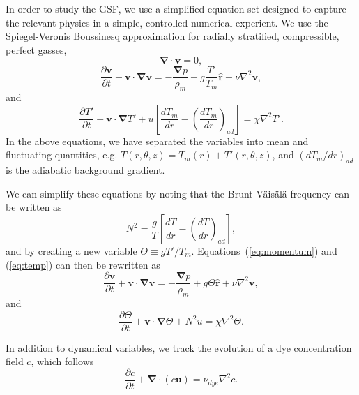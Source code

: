 \documentclass{jfm}
\begin{document}
In order to study the GSF, we use a simplified equation set designed
to capture the relevant physics in a simple, controlled numerical
experient. We use the Spiegel-Veronis Boussinesq approximation for
radially stratified, compressible, perfect gasses,
\begin{equation}
  \label{eq:continuity}
  \mathbf{\nabla \cdot v} = 0,
\end{equation}
\begin{equation}
  \label{eq:momentum}
  \frac{\partial \mathbf{v}}{\partial t} + \mathbf{v \cdot \nabla v} = -\frac{\mathbf{\nabla} p}{\rho_m} + g \frac{T'}{T_m}\mathbf{\hat{r}} + \nu \nabla^2 \mathbf{v},
\end{equation}
and
\begin{equation}
  \label{eq:temp}
  \frac{\partial T'}{\partial t} + \mathbf{v \cdot \nabla} T' + u \left[\frac{d T_m}{dr} - \left(\frac{d T_m}{dr}\right)_{ad}\right] = \chi \nabla^2 T'.
\end{equation}
In the above equations, we have separated the variables into mean and
fluctuating quantities, e.g. $T(r, \theta, z) = T_m(r) + T'(r, \theta, z)$, and $(d T_m/dr)_{ad}$ is the
adiabatic background gradient.

We can simplify these equations by noting that the Brunt-V\"ais\"al\"a frequency can be written as
\begin{equation}
  \label{eq:brunt}
  N^2 = \frac{g}{T}\left[\frac{d T}{dr} - \left(\frac{d T}{dr}\right)_{ad}\right],
\end{equation}
and by creating a new variable $\Theta \equiv g T'/T_m$. Equations~(\ref{eq:momentum}) and (\ref{eq:temp}) can then be rewritten as 
\begin{equation}
  \label{eq:final_momentum}
  \frac{\partial \mathbf{v}}{\partial t} + \mathbf{v \cdot \nabla v} = -\frac{\mathbf{\nabla} p}{\rho_m} + g \Theta \mathbf{\hat{r}} + \nu \nabla^2 \mathbf{v},
\end{equation}
and
\begin{equation}
  \label{eq:final_temp}
  \frac{\partial \Theta}{\partial t} + \mathbf{v \cdot \nabla} \Theta + N^2 u = \chi \nabla^2 \Theta.
\end{equation}

In addition to dynamical variables, we track the evolution of a dye concentration field $c$, which follows 
\begin{equation}
  \label{eq:dye}
  \frac{\partial c}{\partial t} + \mathbf{\nabla \cdot} (c \mathbf{u}) = \nu_{dye} \nabla^2 c.
\end{equation}
\end{document}
